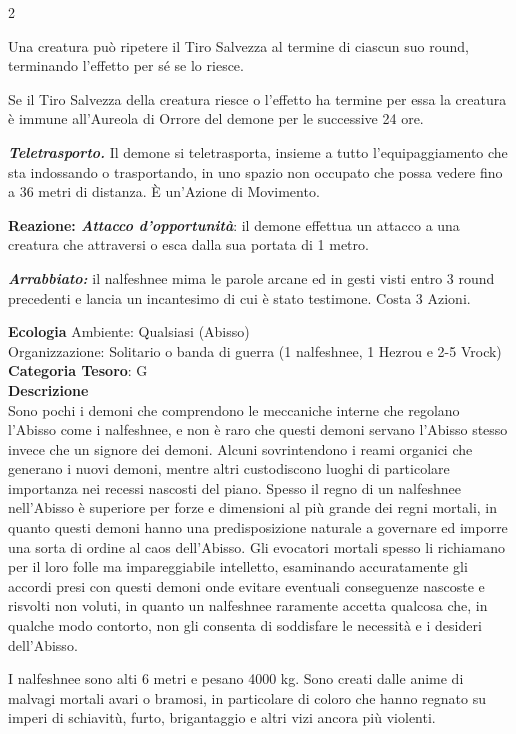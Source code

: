 \begin{multicols}{2}
{Una creatura può ripetere il Tiro Salvezza al termine di ciascun suo round, terminando l'effetto per sé se lo riesce.

Se il Tiro Salvezza della creatura riesce o l'effetto ha termine per essa la creatura è immune all'Aureola di Orrore del demone per le successive 24 ore.

\emph{\textbf{Teletrasporto.}} Il demone si teletrasporta, insieme a tutto l'equipaggiamento che sta indossando o trasportando, in uno spazio non occupato che possa vedere fino a 36 metri di distanza. È un'Azione di Movimento.

\textbf{Reazione: \emph{Attacco d'opportunità}}: il demone effettua un attacco a una creatura che attraversi o esca dalla sua portata di 1 metro.

\emph{\textbf{Arrabbiato:}} il nalfeshnee mima le parole arcane ed in gesti visti entro 3 round precedenti e lancia un incantesimo di cui è stato testimone. Costa 3 Azioni.

\textbf{Ecologia}
Ambiente: Qualsiasi (Abisso)\\
Organizzazione: Solitario o banda di guerra (1 nalfeshnee, 1 Hezrou e 2-5 Vrock)\\
\textbf{Categoria Tesoro}: G\\
\textbf{Descrizione}\\
Sono pochi i demoni che comprendono le meccaniche interne che regolano l'Abisso come i nalfeshnee, e non è raro che questi demoni servano l'Abisso stesso invece che un signore dei demoni. Alcuni sovrintendono i reami organici che generano i nuovi demoni, mentre altri custodiscono luoghi di particolare importanza nei recessi nascosti del piano. Spesso il regno di un nalfeshnee nell'Abisso è superiore per forze e dimensioni al più grande dei regni mortali, in quanto questi demoni hanno una predisposizione naturale a governare ed imporre una sorta di ordine al caos dell'Abisso. Gli evocatori mortali spesso li richiamano per il loro folle ma impareggiabile intelletto, esaminando accuratamente gli accordi presi con questi demoni onde evitare eventuali conseguenze nascoste e risvolti non voluti, in quanto un nalfeshnee raramente accetta qualcosa che, in qualche modo contorto, non gli consenta di soddisfare le necessità e i desideri dell'Abisso.

I nalfeshnee sono alti 6 metri e pesano 4000 kg. Sono creati dalle anime di malvagi mortali avari o bramosi, in particolare di coloro che hanno regnato su imperi di schiavitù, furto, brigantaggio e altri vizi ancora più violenti.

}
\end{multicols}
